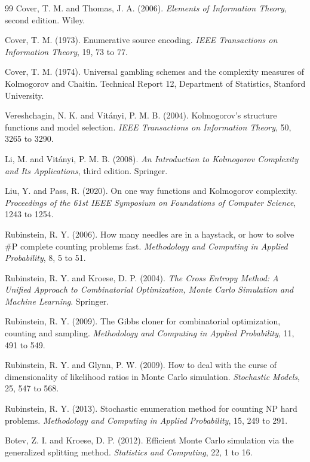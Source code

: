\documentclass[11pt,twoside,openany]{book}
\theoremstyle{plain}
\theoremstyle{definition}
\theoremstyle{remark}
\newcommand{\sharpP}{\#\mathrm{P}}
\begin{document}
\begin{thebibliography}{99}
 Cover, T. M. and Thomas, J. A. (2006). \emph{Elements of Information Theory}, second edition. Wiley.

 Cover, T. M. (1973). Enumerative source encoding. \emph{IEEE Transactions on Information Theory}, 19, 73 to 77.

 Cover, T. M. (1974). Universal gambling schemes and the complexity measures of Kolmogorov and Chaitin. Technical Report 12, Department of Statistics, Stanford University.

 Vereshchagin, N. K. and Vit\'anyi, P. M. B. (2004). Kolmogorov's structure functions and model selection. \emph{IEEE Transactions on Information Theory}, 50, 3265 to 3290.

 Li, M. and Vit\'anyi, P. M. B. (2008). \emph{An Introduction to Kolmogorov Complexity and Its Applications}, third edition. Springer.

 Liu, Y. and Pass, R. (2020). On one way functions and Kolmogorov complexity. \emph{Proceedings of the 61st IEEE Symposium on Foundations of Computer Science}, 1243 to 1254.

 Rubinstein, R. Y. (2006). How many needles are in a haystack, or how to solve $\sharpP$ complete counting problems fast. \emph{Methodology and Computing in Applied Probability}, 8, 5 to 51.

 Rubinstein, R. Y. and Kroese, D. P. (2004). \emph{The Cross Entropy Method: A Unified Approach to Combinatorial Optimization, Monte Carlo Simulation and Machine Learning}. Springer.

 Rubinstein, R. Y. (2009). The Gibbs cloner for combinatorial optimization, counting and sampling. \emph{Methodology and Computing in Applied Probability}, 11, 491 to 549.

 Rubinstein, R. Y. and Glynn, P. W. (2009). How to deal with the curse of dimensionality of likelihood ratios in Monte Carlo simulation. \emph{Stochastic Models}, 25, 547 to 568.

 Rubinstein, R. Y. (2013). Stochastic enumeration method for counting NP hard problems. \emph{Methodology and Computing in Applied Probability}, 15, 249 to 291.

 Botev, Z. I. and Kroese, D. P. (2012). Efficient Monte Carlo simulation via the generalized splitting method. \emph{Statistics and Computing}, 22, 1 to 16.


\end{thebibliography}
\end{document}

